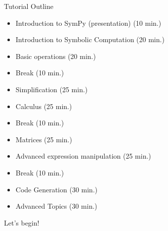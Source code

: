 \documentclass[xcolor=svgnames]{beamer}
\begin{document}
\begin{frame}{Tutorial Outline}
  \begin{block}{}
    \begin{itemize}
\item Introduction to SymPy (presentation) (10 min.)

\item Introduction to Symbolic Computation (20 min.)

\item Basic operations (20 min.)

\item Break (10 min.)

\item Simplification (25 min.)

\item Calculus (25 min.)

\item Break (10 min.)

\item Matrices (25 min.)

\item Advanced expression manipulation (25 min.)

\item Break (10 min.)

\item Code Generation (30 min.)

\item Advanced Topics (30 min.)
    \end{itemize}
  \end{block}
\end{frame}

\begin{frame}
\Huge Let's begin!
\end{frame}
\end{document}
